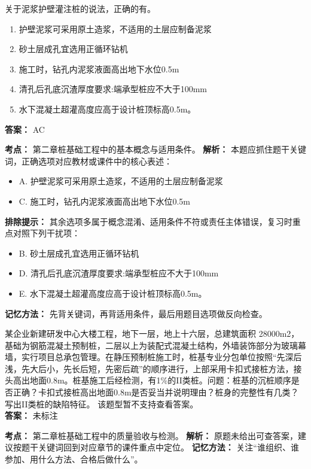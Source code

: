 \documentclass[UTF8,fontset=fandol,11pt]{ctexart}
\begin{document}
\begin{quizbox}[title={第 11 题}]
关于泥浆护壁灌注桩的说法，正确的有。\\
\begin{enumerate}[label=\Alph*.]
\item 护壁泥浆可采用原土造浆，不适用的土层应制备泥浆
\item 砂土层成孔宜选用正循环钻机
\item 施工时，钻孔内泥浆液面高出地下水位0.5m
\item 清孔后孔底沉渣厚度要求:端承型桩应不大于100mm
\item 水下混凝土超灌高度应高于设计桩顶标高0.5m。
\end{enumerate}
\textbf{答案：} AC
\vspace{0.25em}
\begin{answerbox}[title={考点解析}]
\textbf{考点：} 第二章桩基础工程中的基本概念与适用条件。
\textbf{解析：} 本题应抓住题干关键词，正确选项对应教材或课件中的核心表述：
\begin{itemize}
\item A. 护壁泥浆可采用原土造浆，不适用的土层应制备泥浆
\item C. 施工时，钻孔内泥浆液面高出地下水位0.5m
\end{itemize}
\textbf{排除提示：} 其余选项多属于概念混淆、适用条件不符或责任主体错误，复习时重点对照下列干扰项：
\begin{itemize}
\item B. 砂土层成孔宜选用正循环钻机
\item D. 清孔后孔底沉渣厚度要求:端承型桩应不大于100mm
\item E. 水下混凝土超灌高度应高于设计桩顶标高0.5m。
\end{itemize}
\textbf{记忆方法：} 先背关键词，再背适用条件，最后用题目选项做反向检查。
\end{answerbox}
\end{quizbox}

\begin{quizbox}[title={第 12 题}]
某企业新建研发中心大楼工程，地下一层，地上十六层，总建筑面积 28000m2，基础为钢筋混凝土预制桩，二层以上为装配式混凝土结构，外墙装饰部分为玻璃幕墙，实行项目总承包管理。在静压预制桩施工时，桩基专业分包单位按照“先深后浅，先大后小，先长后短，先密后疏”的顺序进行，上部采用卡扣式接桩方法，接头高出地面0.8m。桩基施工后经检测，有1\%的II类桩。问题：桩基的沉桩顺序是否正确？卡扣式接桩高出地面0.8m是否妥当并说明理由？桩身的完整性有几类？写出II类桩的缺陷特征。 该题型暂不支持查看答案。\\
\textbf{答案：} 未标注
\vspace{0.25em}
\begin{answerbox}[title={考点解析}]
\textbf{考点：} 第二章桩基础工程中的质量验收与检测。
\textbf{解析：} 原题未给出可查答案，建议按题干关键词回到对应章节的课件重点中定位。
\textbf{记忆方法：} 关注“谁组织、谁参加、用什么方法、合格后做什么”。
\end{answerbox}
\end{quizbox}
\end{document}
